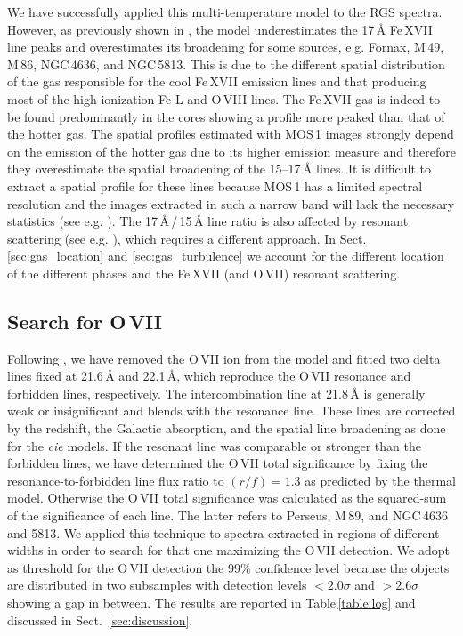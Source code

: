 \documentclass[useAMS,usenatbib]{mn2e}
\begin{document}
We have successfully applied this multi-temperature model to the RGS spectra.
However, as previously shown in \citet{Pinto2015},
the model underestimates the 17\,{\AA} Fe\,{\small XVII} 
line peaks and overestimates its broadening
for some sources, e.g. Fornax, M\,49, M\,86, NGC\,4636, and NGC\,5813.
This is due to the different spatial distribution of the gas 
responsible for the cool Fe\,{\small XVII} emission lines and 
that producing most of the high-ionization Fe-L and O\,{\small VIII} lines. 
The Fe\,{\small XVII} gas is indeed to be found predominantly in the cores
showing a profile more peaked than that of the hotter gas. 
The spatial profiles estimated with MOS\,1 images strongly depend on the emission 
of the hotter gas due to its higher emission measure
and therefore they overestimate the spatial broadening of the 15--17\,{\AA} lines.
It is difficult to extract a spatial profile for these lines 
because MOS\,1 has a limited spectral resolution
and the images extracted in such a narrow band will lack the necessary statistics 
(see e.g. \citealt{Sanders2013}). 
The 17\,{\AA}\,/\,15\,{\AA} line ratio is also affected 
by resonant scattering (see e.g. \citealt{Gilfanov1987, Sanders2008}), 
which requires a different approach. 
In Sect.\,\ref{sec:gas_location} and \ref{sec:gas_turbulence} 
we account for the different location of the different phases 
and the Fe\,{\small XVII} (and O\,{\small VII}) resonant scattering. 

\subsection{Search for O\,{\small VII}}
\label{sec:search_ovii}

Following \citet{Pinto2014}, we have removed the {O\,{\small VII}} ion from the model
and fitted two delta lines fixed at 21.6\,{\AA} and 22.1\,{\AA}, 
which reproduce the {O\,{\small VII}} resonance and forbidden lines, respectively.
The intercombination line at 21.8\,{\AA} is generally weak or insignificant 
and blends with the resonance line.
These lines are corrected by the redshift, the Galactic absorption,
and the spatial line broadening as done for the \textit{cie} models.
If the resonant line was comparable or stronger than the forbidden lines,
we have determined the {O\,{\small VII}} total significance 
by fixing the resonance-to-forbidden line flux ratio 
to $(r/f) = 1.3$ as predicted by the thermal model.
Otherwise the {O\,{\small VII}} total significance was calculated
as the squared-sum of the significance of each line. 
The latter refers to Perseus, M\,89, and NGC\,4636 and 5813.
We applied this technique to spectra extracted in regions of different widths
in order to search for that one maximizing the {O\,{\small VII}} detection.
We adopt as threshold for the {O\,{\small VII}} detection the 99\% confidence level
because the objects are distributed in two subsamples with detection levels 
$<2.0\sigma$ and $>2.6\sigma$ showing a gap in between.
The results are reported in Table\,\ref{table:log} 
and discussed in Sect.~\ref{sec:discussion}.
\end{document}
